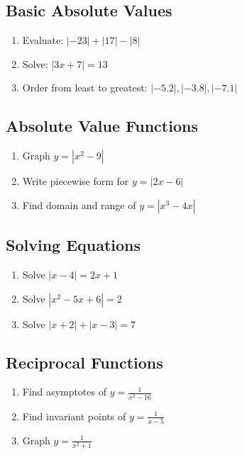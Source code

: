 \documentclass[12pt]{article}
\begin{document}
\subsection*{Basic Absolute Values}
\begin{enumerate}
    \item Evaluate: $|-23| + |17| - |8|$
    \item Solve: $|3x + 7| = 13$
    \item Order from least to greatest: $|-5.2|, |-3.8|, |-7.1|$
\end{enumerate}

\subsection*{Absolute Value Functions}
\begin{enumerate}
    \item Graph $y = |x^2 - 9|$
    \item Write piecewise form for $y = |2x - 6|$
    \item Find domain and range of $y = |x^3 - 4x|$
\end{enumerate}

\subsection*{Solving Equations}
\begin{enumerate}
    \item Solve $|x-4| = 2x + 1$
    \item Solve $|x^2-5x+6| = 2$
    \item Solve $|x+2| + |x-3| = 7$
\end{enumerate}

\subsection*{Reciprocal Functions}
\begin{enumerate}
    \item Find asymptotes of $y = \frac{1}{x^2-16}$
    \item Find invariant points of $y = \frac{1}{x-5}$
    \item Graph $y = \frac{1}{x^2+1}$
\end{enumerate}
\end{document}
